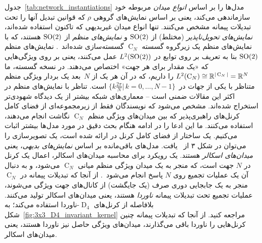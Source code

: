جدول~\ref{tab:network_instantiations} مدل‌ها را بر اساس \emph{انواع میدان} مربوطه خود سازماندهی می‌کند، یعنی بر اساس نمایش‌های گروهی $\rho$ که قوانین تبدیل آنها را تحت تبدیلات پیمانه مشخص می‌کنند.
تنها انواع میدان غیربدیهی که تاکنون استفاده شده‌اند، \emph{نمایش‌های تحویل‌ناپذیر} (مختلط) از $\operatorname{SO}(2)$ \cite{Wiersma2020} و \emph{نمایش‌های منظم} از $\operatorname{SO}(2)$ هستند، که با نمایش‌های منظم یک زیرگروه گسسته $\operatorname{C}_N$ گسسته‌سازی شده‌اند~\cite{poulenard2018multi,sun2018zernet,deHaan2020meshCNNs,Yang2020parallelFrameCNN}.
نمایش‌های منظم $\operatorname{SO}(2)$ بنا به تعریف بر روی توابع در $L^2(\operatorname{SO}(2))$ عمل می‌کنند، یعنی بر روی ویژگی‌هایی که «یک مقدار برای هر جهت» اختصاص می‌دهند.
در نسخه گسسته، ما $L^2(\operatorname{C}_N) \cong \mathbb{R}^{|\operatorname{C}_N|} = \mathbb{R}^N$ را داریم، که در آن هر یک از $N$~بعد یک بردار ویژگی منظم متناظر با یکی از جهات در~$\big\{ k\frac{2\pi}{N} \big|\, k=0,\dots,N-1 \big\}$ است.
تناظر با نمایش‌های منظم در اکثر این مقالات ضمنی است -- معماری‌های شبکه بیشتر از یک دیدگاه شهودی‌تر استخراج شده‌اند.
مشخص می‌شود که نویسندگان فقط از زیرمجموعه‌ای از فضای کامل کرنل‌های راهبری‌پذیر که بین میدان‌های ویژگی منظم $\operatorname{C}_N$ نگاشت انجام می‌دهند، استفاده می‌کنند.
ما این ادعا را در ادامه هنگام بحث دقیق در مورد مدل‌ها بیشتر اثبات می‌کنیم.
یک ساختار از فضای کامل کرنل در \cite{Weiler2019_E2CNN} ارائه شده است، یک تصویرسازی را می‌توان در شکل ۳ از~\cite{Weiler2018SFCNN} یافت.
مدل‌های باقی‌مانده بر اساس \emph{نمایش‌های بدیهی}، یعنی \emph{میدان‌های اسکالر} هستند.
یک رویکرد برای محاسبه میدان‌های اسکالر، اعمال یک کرنل در $N$ جهت است، که منجر به یک میدان ویژگی منظم میانی $\operatorname{C}_N$ می‌شود، و به دنبال آن یک عملیات تجمیع روی $N$ پاسخ انجام می‌شود~\cite{masci2015geodesic,monti2017geometric,sun2018zernet}.
از آنجا که تبدیلات پیمانه در $\operatorname{C}_N$ منجر به یک جابجایی دوری صرف (یک جایگشت) از کانال‌های جهت ویژگی می‌شوند، عملیات تجمیع تحت تبدیلات پیمانه \emph{ناوردا} هستند، یعنی میدان‌های اسکالر تولید می‌کنند.
\citet{huang2019texturenet} بلافاصله از کرنل‌های $\operatorname{D}_4$-ناوردا استفاده می‌کند؛ به شکل~\ref{fig:3x3_D4_invariant_kernel} مراجعه کنید.
از آنجا که تبدیلات پیمانه چنین کرنل‌هایی را ناوردا باقی می‌گذارند، میدان‌های ویژگی حاصل نیز ناوردا هستند، یعنی میدان‌های اسکالر.


